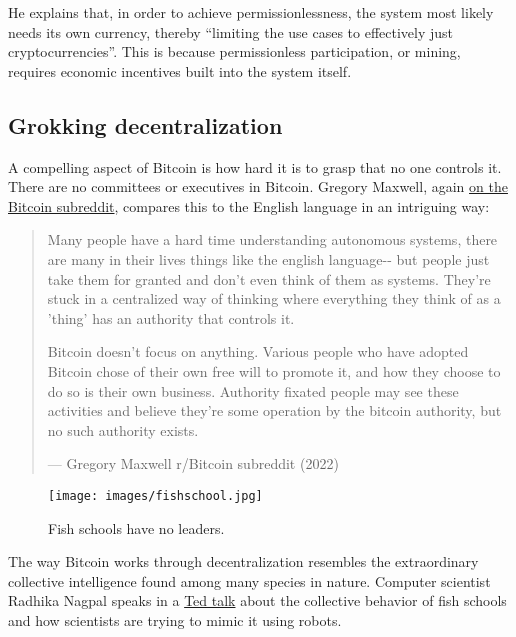 He explains that, in order to achieve permissionlessness, the system
most likely needs its own currency, thereby ``limiting the use cases to
effectively just cryptocurrencies''. This is because permissionless
participation, or mining, requires economic incentives built into the
system itself.

\hypertarget{_grokking_decentralization}{%
\subsection{Grokking
decentralization}\label{_grokking_decentralization}}

A compelling aspect of Bitcoin is how hard it is to grasp that no one
controls it. There are no committees or executives in Bitcoin. Gregory
Maxwell, again
\href{https://www.reddit.com/r/Bitcoin/comments/s82t2n/comment/htdte7w/?utm_source=share\&utm_medium=web2x\&context=3}{on
the Bitcoin subreddit}, compares this to the English language in an
intriguing way:

\begin{quote}
Many people have a hard time understanding autonomous systems, there are
many in their lives things like the english language-\/- but people just
take them for granted and don't even think of them as systems. They're
stuck in a centralized way of thinking where everything they think of as
a 'thing' has an authority that controls it.

Bitcoin doesn't focus on anything. Various people who have adopted
Bitcoin chose of their own free will to promote it, and how they choose
to do so is their own business. Authority fixated people may see these
activities and believe they're some operation by the bitcoin authority,
but no such authority exists.

---  Gregory Maxwell r/Bitcoin subreddit (2022)
\end{quote}

\begin{figure}
\centering
\texttt{[image: images/fishschool.jpg]}
\caption{Fish schools have no leaders.}
\end{figure}

The way Bitcoin works through decentralization resembles the
extraordinary collective intelligence found among many species in
nature. Computer scientist Radhika Nagpal speaks in a
\href{https://www.ted.com/talks/radhika_nagpal_what_intelligent_machines_can_learn_from_a_school_of_fish}{Ted
talk} about the collective behavior of fish schools and how scientists
are trying to mimic it using robots.

